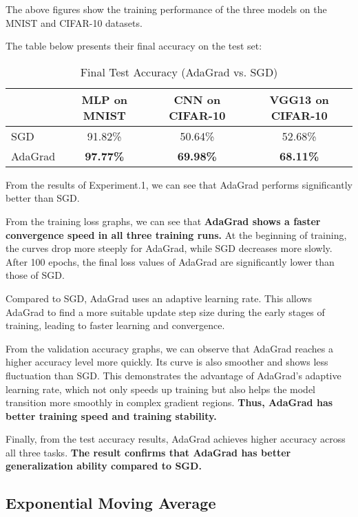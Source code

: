 \documentclass[12pt]{article}
\begin{document}
The above figures show the training performance of the three models on the MNIST and CIFAR-10 datasets. 

The table below presents their final accuracy on the test set:


\begin{table}[H]
\centering
\caption{Final Test Accuracy (AdaGrad vs. SGD)}
\label{tab:final_accuracy_transposed}
\begin{tabular}{|l|c|c|c|}
\hline
        & MLP on MNIST & CNN on CIFAR-10 & VGG13 on CIFAR-10 \\ \hline
SGD     & 91.82\%      & 50.64\%         & 52.68\%           \\ \hline
AdaGrad & \textbf{97.77\%} & \textbf{69.98\%}  & \textbf{68.11\%}    \\ \hline
\end{tabular}
\end{table}

From the results of Experiment.1, we can see that AdaGrad performs significantly better than SGD.

From the training loss graphs, we can see that \textbf{AdaGrad shows a faster convergence speed in all three training runs.} At the beginning of training, the curves drop more steeply for AdaGrad, while SGD decreases more slowly. After 100 epochs, the final loss values of AdaGrad are significantly lower than those of SGD.

Compared to SGD, AdaGrad uses an adaptive learning rate. This allows AdaGrad to find a more suitable update step size during the early stages of training, leading to faster learning and convergence.

From the validation accuracy graphs, we can observe that AdaGrad reaches a higher accuracy level more quickly. Its curve is also smoother and shows less fluctuation than SGD. This demonstrates the advantage of AdaGrad’s adaptive learning rate, which not only speeds up training but also helps the model transition more smoothly in complex gradient regions. \textbf{Thus, AdaGrad has better training speed and training stability.}

Finally, from the test accuracy results, AdaGrad achieves higher accuracy across all three tasks. \textbf{The result confirms that AdaGrad has better generalization ability compared to SGD.}




\subsection{Exponential Moving Average}
\end{document}
